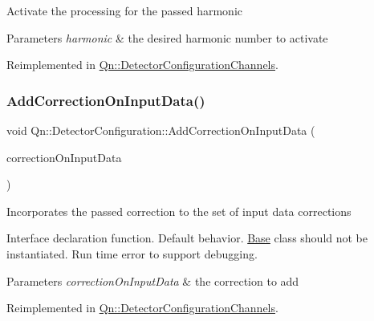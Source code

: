 Activate the processing for the passed harmonic 
\begin{DoxyParams}{Parameters}
{\em harmonic} & the desired harmonic number to activate \\
\hline
\end{DoxyParams}


Reimplemented in \mbox{\hyperlink{classQn_1_1DetectorConfigurationChannels_a6e0cb5f19763dd57e017325d456adb39}{Qn\+::\+Detector\+Configuration\+Channels}}.

\mbox{\label{classQn_1_1DetectorConfiguration_ab65571f46d348c2b07d3b03fc1e6cf11}} 
\subsubsection{\texorpdfstring{Add\+Correction\+On\+Input\+Data()}{AddCorrectionOnInputData()}}
{\footnotesize\ttfamily void Qn\+::\+Detector\+Configuration\+::\+Add\+Correction\+On\+Input\+Data (\begin{DoxyParamCaption}\item[{\mbox{\hyperlink{classQn_1_1CorrectionOnInputData}{Correction\+On\+Input\+Data}} $\ast$}]{correction\+On\+Input\+Data }\end{DoxyParamCaption})\hspace{0.3cm}{\ttfamily [virtual]}}

Incorporates the passed correction to the set of input data corrections

Interface declaration function. Default behavior. \mbox{\hyperlink{classBase}{Base}} class should not be instantiated. Run time error to support debugging.


\begin{DoxyParams}{Parameters}
{\em correction\+On\+Input\+Data} & the correction to add \\
\hline
\end{DoxyParams}


Reimplemented in \mbox{\hyperlink{classQn_1_1DetectorConfigurationChannels_ab5c641503809ce981651bb08ffc50f0e}{Qn\+::\+Detector\+Configuration\+Channels}}.

\mbox{\label{classQn_1_1DetectorConfiguration_a7c6c8b72521714d859c0c718cba9db5b}} 
